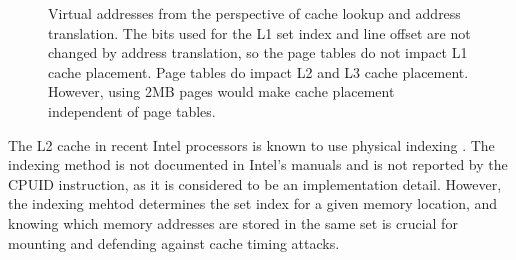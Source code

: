 \begin{figure}[hbtp]
  \caption{
    Virtual addresses from the perspective of cache lookup and address
    translation. The bits used for the L1 set index and line offset are not
    changed by address translation, so the page tables do not impact L1 cache
    placement. Page tables do impact L2 and L3 cache placement. However, using
    2MB pages would make cache placement independent of page tables.
  }
  \label{fig:caching_and_paging}
\end{figure}

The L2 cache in recent Intel processors is known to use physical indexing
\cite{patterson2013architecture}. The indexing method is not documented in
Intel's manuals and is not reported by the CPUID instruction, as it is
considered to be an implementation detail. However, the indexing mehtod
determines the set index for a given memory location, and knowing which memory
addresses are stored in the same set is crucial for mounting and defending
against cache timing attacks.
